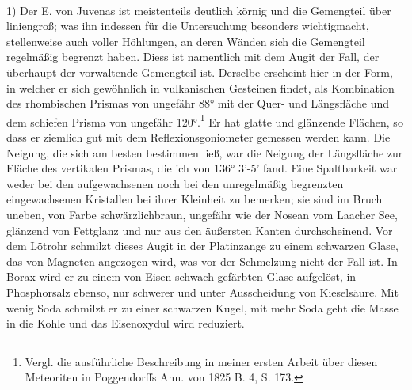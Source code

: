 \documentclass[a4paper, 11pt, oneside]{article}
\begin{document}
\paragraph{}
1) Der E. von Juvenas ist meistenteils deutlich körnig und die Gemengteil über liniengroß; was ihn indessen für die Untersuchung besonders wichtigmacht, stellenweise auch voller Höhlungen‚ an deren Wänden sich die Gemengteil regelmäßig begrenzt haben. Diess ist namentlich mit dem Augit der Fall, der überhaupt der vorwaltende Gemengteil ist. Derselbe erscheint hier in der Form, in welcher er sich gewöhnlich in vulkanischen Gesteinen findet, als Kombination des rhombischen Prismas von ungefähr 88° mit der Quer- und Längsfläche und dem schiefen Prisma von ungefähr 120°.\footnote{Vergl. die ausführliche Beschreibung in meiner ersten Arbeit über diesen Meteoriten in Poggendorffs Ann. von 1825 B. 4, S. 173.} Er hat glatte und glänzende Flächen, so dass er ziemlich gut mit dem Reflexionsgoniometer gemessen werden kann. Die Neigung, die sich am besten bestimmen ließ, war die Neigung der Längsfläche zur Fläche des vertikalen Prismas, die ich von 136° 3’-5’ fand. Eine Spaltbarkeit war weder bei den aufgewachsenen noch bei den unregelmäßig begrenzten eingewachsenen Kristallen bei ihrer Kleinheit zu bemerken; sie sind im Bruch uneben, von Farbe schwärzlichbraun, ungefähr wie der Nosean vom Laacher See, glänzend von Fettglanz und nur aus den äußersten Kanten durchscheinend. Vor dem Lötrohr schmilzt dieses Augit in der Platinzange zu einem schwarzen Glase, das von Magneten angezogen wird, was vor der Schmelzung nicht der Fall ist. In Borax wird er zu einem von Eisen schwach gefärbten Glase aufgelöst, in Phosphorsalz ebenso, nur schwerer und unter Ausscheidung von Kieselsäure. Mit wenig Soda schmilzt er zu einer schwarzen Kugel, mit mehr Soda geht die Masse in die Kohle und das Eisenoxydul wird reduziert.
\end{document}
